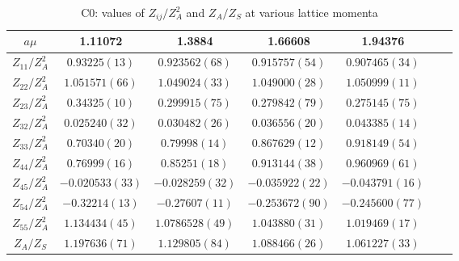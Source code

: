 \begin{table}
\begin{center}
\caption{\label{tab:C0renormvals}C0: values of $Z_{ij}/Z_A^2$ and $Z_A/Z_S$ at various lattice momenta}
\begin{tabular}{c|c c c c c c}
\hline
\hline
$a\mu$ & 1.11072 & 1.3884 & 1.66608 & 1.94376 \\
\hline
$Z_{11}/Z_A^2$ & $0.93225(13)$ & $0.923562(68)$ & $0.915757(54)$ & $0.907465(34)$ \\
\hline
$Z_{22}/Z_A^2$ & $1.051571(66)$ & $1.049024(33)$ & $1.049000(28)$ & $1.050999(11)$ \\
$Z_{23}/Z_A^2$ & $0.34325(10)$ & $0.299915(75)$ & $0.279842(79)$ & $0.275145(75)$ \\
$Z_{32}/Z_A^2$ & $0.025240(32)$ & $0.030482(26)$ & $0.036556(20)$ & $0.043385(14)$ \\
$Z_{33}/Z_A^2$ & $0.70340(20)$ & $0.79998(14)$ & $0.867629(12)$ & $0.918149(54)$ \\
\hline
$Z_{44}/Z_A^2$ & $0.76999(16)$ & $0.85251(18)$ & $0.913144(38)$ & $0.960969(61)$ \\
$Z_{45}/Z_A^2$ & $-0.020533(33)$ & $-0.028259(32)$ & $-0.035922(22)$ & $-0.043791(16)$ \\
$Z_{54}/Z_A^2$ & $-0.32214(13)$ & $-0.27607(11)$ & $-0.253672(90)$ & $-0.245600(77)$ \\
$Z_{55}/Z_A^2$ & $1.134434(45)$ & $1.0786528(49)$ & $1.043880(31)$ & $1.019469(17)$ \\
\hline
$Z_A/Z_S$ & $1.197636(71)$ & $1.129805(84)$ & $1.088466(26)$ & $1.061227(33)$ \\
\hline
\hline
\end{tabular}
\end{center}
\end{table}